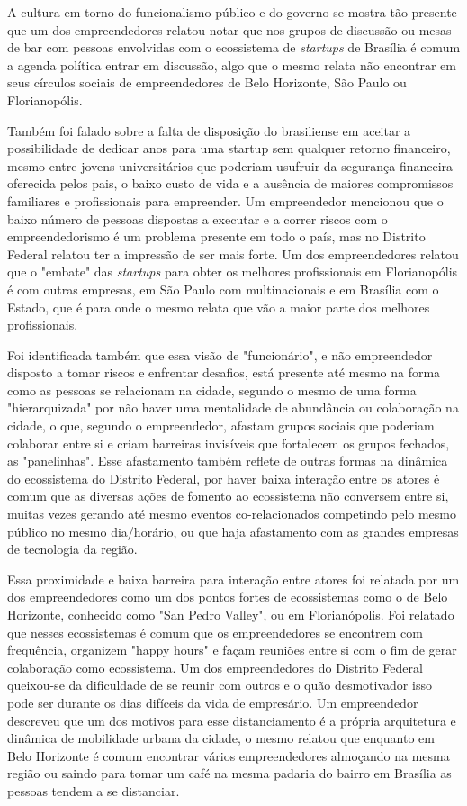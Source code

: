 A cultura em torno do funcionalismo público e do governo se mostra tão presente que um dos empreendedores relatou notar que nos grupos de discussão ou mesas de bar com pessoas envolvidas com o ecossistema de \textit{startups} de Brasília é comum a agenda política entrar em discussão, algo que o mesmo relata não encontrar em seus círculos sociais de empreendedores de Belo Horizonte, São Paulo ou Florianopólis.

Também foi falado sobre a falta de disposição do brasiliense em aceitar a possibilidade de dedicar anos para uma startup sem qualquer retorno financeiro, mesmo entre jovens universitários que poderiam usufruir da segurança financeira oferecida pelos pais, o baixo custo de vida e a ausência de maiores compromissos familiares e profissionais para empreender. Um empreendedor mencionou que o baixo número de pessoas dispostas a executar e a correr riscos com o empreendedorismo é um problema presente em todo o país, mas no Distrito Federal relatou ter a impressão de ser mais forte. Um dos empreendedores relatou que o "embate" das \textit{startups} para obter os melhores profissionais em Florianopólis é com outras empresas, em São Paulo com multinacionais e em Brasília com o Estado, que é para onde o mesmo relata que vão a maior parte dos melhores profissionais.

Foi identificada também que essa visão de "funcionário", e não empreendedor disposto a tomar riscos e enfrentar desafios, está presente até mesmo na forma como as pessoas se relacionam na cidade, segundo o mesmo de uma forma "hierarquizada" por não haver uma mentalidade de abundância ou colaboração na cidade, o que, segundo o empreendedor, afastam grupos sociais que poderiam colaborar entre si e criam barreiras invisíveis que fortalecem os grupos fechados, as "panelinhas". Esse afastamento também reflete de outras formas na dinâmica do ecossistema do Distrito Federal, por haver baixa interação entre os atores é comum que as diversas ações de fomento ao ecossistema não conversem entre si, muitas vezes gerando até mesmo eventos co-relacionados competindo pelo mesmo público no mesmo dia/horário, ou que haja afastamento com as grandes empresas de tecnologia da região.

Essa proximidade e baixa barreira para interação entre atores foi relatada por um dos empreendedores como um dos pontos fortes de ecossistemas como o de Belo Horizonte, conhecido como "San Pedro Valley", ou em Florianópolis. Foi relatado que nesses ecossistemas é comum que os empreendedores se encontrem com frequência, organizem "happy hours" e façam reuniões entre si com o fim de gerar colaboração como ecossistema. Um dos empreendedores do Distrito Federal queixou-se da dificuldade de se reunir com outros e o quão desmotivador isso pode ser durante os dias difíceis da vida de empresário. Um empreendedor descreveu que um dos motivos para esse distanciamento é a própria arquitetura e dinâmica de mobilidade urbana da cidade, o mesmo relatou que enquanto em Belo Horizonte é comum encontrar vários empreendedores almoçando na mesma região ou saindo para tomar um café na mesma padaria do bairro em Brasília as pessoas tendem a se distanciar.

